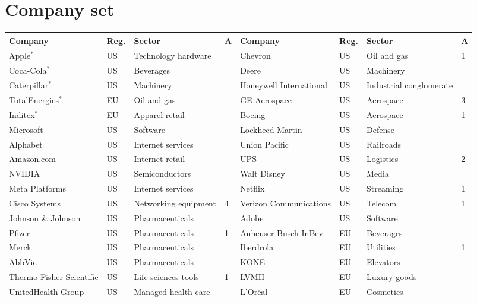 \documentclass[10pt,a4paper]{article}
\begin{document}
\appendix
\section{Company set}
\label{app:companies}

\begin{table}[H]
\centering
\footnotesize
\setlength{\tabcolsep}{4pt}
\begin{tabular}{llll@{\hspace{14pt}}llll}
\toprule
Company & Reg. & Sector & A & Company & Reg. & Sector & A \\
\midrule
Apple$^{\ast}$ & US & Technology hardware &  & Chevron & US & Oil and gas & 1 \\
Coca-Cola$^{\ast}$ & US & Beverages &  & Deere & US & Machinery &  \\
Caterpillar$^{\ast}$ & US & Machinery &  & Honeywell International & US & Industrial conglomerate &  \\
TotalEnergies$^{\ast}$ & EU & Oil and gas &  & GE Aerospace & US & Aerospace & 3 \\
Inditex$^{\ast}$ & EU & Apparel retail &  & Boeing & US & Aerospace & 1 \\
Microsoft & US & Software &  & Lockheed Martin & US & Defense &  \\
Alphabet & US & Internet services &  & Union Pacific & US & Railroads &  \\
Amazon.com & US & Internet retail &  & UPS & US & Logistics & 2 \\
NVIDIA & US & Semiconductors &  & Walt Disney & US & Media &  \\
Meta Platforms & US & Internet services &  & Netflix & US & Streaming & 1 \\
Cisco Systems & US & Networking equipment & 4 & Verizon Communications & US & Telecom & 1 \\
Johnson \& Johnson & US & Pharmaceuticals &  & Adobe & US & Software &  \\
Pfizer & US & Pharmaceuticals & 1 & Anheuser-Busch InBev & EU & Beverages &  \\
Merck & US & Pharmaceuticals &  & Iberdrola & EU & Utilities & 1 \\
AbbVie & US & Pharmaceuticals &  & KONE & EU & Elevators &  \\
Thermo Fisher Scientific & US & Life sciences tools & 1 & LVMH & EU & Luxury goods &  \\
UnitedHealth Group & US & Managed health care &  & L'Oréal & EU & Cosmetics &  \\

\end{tabular}
\end{table}
\end{document}

